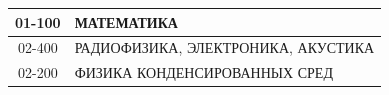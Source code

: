 \begin{table}
\begin{center}
\begin{tabular}{|c|l|}
\hline


01-100&МАТЕМАТИКА\\


\hline


02-400&РАДИОФИЗИКА, ЭЛЕКТРОНИКА, АКУСТИКА\\


\hline


02-200&ФИЗИКА КОНДЕНСИРОВАННЫХ СРЕД\\


\hline


\end{tabular}


\end{center}


\end{table}


       





